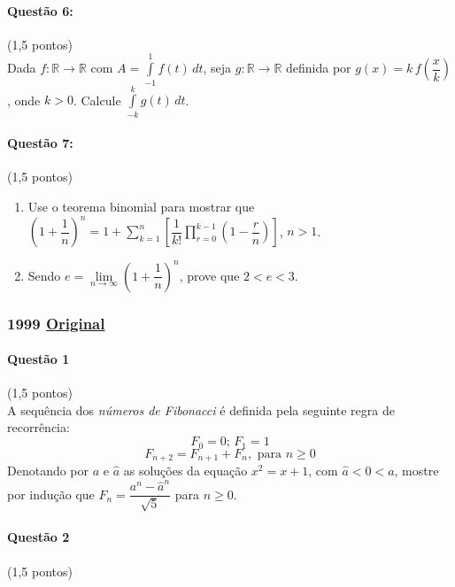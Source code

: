 \documentclass[12pt,a4paper]{article}
\newcommand{\original}[1]{\tiny \href{#1}{Original} \normalsize}
\begin{document}
\paragraph{Questão 6:}(1,5 pontos)\\
Dada $f:\mathbb{R}\rightarrow \mathbb{R}$ com $A=\displaystyle\int\limits_{-1}^{1}f(t)\,dt$, seja $g:\mathbb{R}\rightarrow \mathbb{R}$ definida por $g(x)=k\,f\left ( \dfrac{x}{k} \right )$, onde $k>0$. Calcule $\displaystyle\int\limits_{-k}^{k}g(t)\,dt$.

\paragraph{Questão 7:}(1,5 pontos)

\begin{enumerate}[label=(\alph*)]

\item Use o teorema binomial para mostrar que $\left ( 1 + \dfrac{1}{n} \right )^n=1+\displaystyle\sum\limits_{k=1}^{n}\left [ \dfrac{1}{k!}\prod\limits_{r=0}^{k-1}\left ( 1-\dfrac{r}{n} \right ) \right ]$, $n>1$.

\item Sendo $e=\lim\limits_{n \to \infty }\left ( 1+\dfrac{1}{n} \right )^n$, prove que $2<e<3$.

\end{enumerate}

\newpage

\subsubsection{1999 \original{https://drive.google.com/open?id=1snMUbdOrwCUuMMJlK3MbSkC5GsHhvhdz}}

\paragraph{Questão 1} (1,5 pontos)\\
A sequência dos \textit{números de Fibonacci} é definida pela seguinte regra de recorrência:$$F_0 = 0;\, F_1 = 1$$$$ F_{n+2}=F_{n+1}+F_n, \text{ para }n\ge 0$$Denotando por $a$ e $\hat{a}$ as soluções da equação $x^2=x+1$, com $\hat{a}<0<a$, mostre por indução que $F_n = \dfrac{a^n-\hat{a}^n}{\sqrt{5}}$ para $n\ge 0$.

\paragraph{Questão 2} (1,5 pontos)\\
\end{document}
